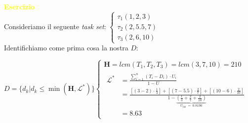 \newpage
\textcolor{yellow}{\textbf{Esercizio}} \\
Consideriamo il seguente \textit{task set}: 
\begin{math}
    \begin{cases}
        \tau_1(1, 2, 3) \\
        \tau_2(2, 5.5, 7) \\
        \tau_3(2, 6, 10)
    \end{cases}
\end{math}
\\ \newline
Identifichiamo come prima cosa la nostra $D$: 
\begin{center}
    \begin{math}
        D = \{d_k | d_k \leq \min (\mathbf{H}, \mathcal{L}^*)\}
        \begin{cases}
            \mathbf{H} = lcm(T_1, T_2, T_3) = lcm(3, 7, 10) = 210 \\
            \begin{aligned}
                \mathcal{L}^* &= \frac{\sum_{i=1}^n (T_i - D_i) \cdot U_i}{1 - U} \\ 
                &= \frac{[(3 - 2) \cdot \frac{1}{3}] + [(7 - 5.5) \cdot \frac{2}{7}] + [(10 - 6) \cdot \frac{2}{10}]}{1 - \underbrace{(\frac{1}{3} + \frac{2}{7} + \frac{2}{10})}_{U_{lub} \; = \; 0.8190}} \\
                &= 8.63
            \end{aligned}
        \end{cases}
    \end{math}
\end{center}
